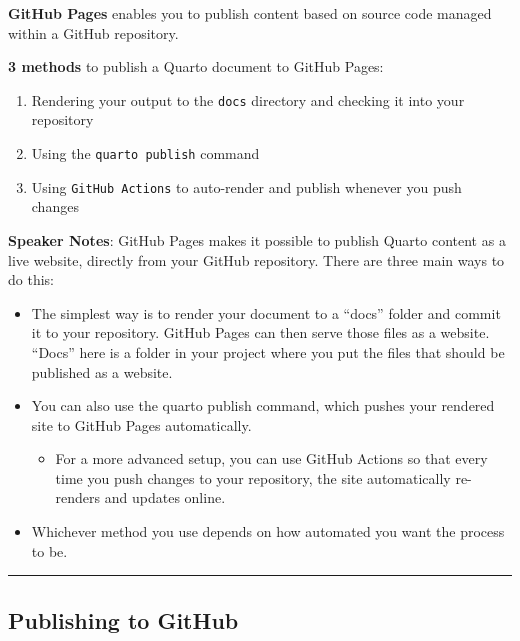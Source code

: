 \documentclass[
  letterpaper,
  DIV=11,
  numbers=noendperiod]{scrartcl}
\providecommand{\tightlist}{%
  \setlength{\itemsep}{0pt}\setlength{\parskip}{0pt}}
\begin{document}
\textbf{GitHub Pages} enables you to publish content based on source
code managed within a GitHub repository.

\textbf{3 methods} to publish a Quarto document to GitHub Pages:

\begin{enumerate}
\def\labelenumi{\arabic{enumi}.}
\tightlist
\item
  Rendering your output to the \texttt{docs} directory and checking it
  into your repository
\item
  Using the \texttt{quarto\ publish} command
\item
  Using \texttt{GitHub\ Actions} to auto-render and publish whenever you
  push changes
\end{enumerate}

\textbf{Speaker Notes}: GitHub Pages makes it possible to publish Quarto
content as a live website, directly from your GitHub repository. There
are three main ways to do this:

\begin{itemize}
\item
  The simplest way is to render your document to a ``docs'' folder and
  commit it to your repository. GitHub Pages can then serve those files
  as a website. ``Docs'' here is a folder in your project where you put
  the files that should be published as a website.
\item
  You can also use the quarto publish command, which pushes your
  rendered site to GitHub Pages automatically.

  \begin{itemize}
  \tightlist
  \item
    For a more advanced setup, you can use GitHub Actions so that every
    time you push changes to your repository, the site automatically
    re-renders and updates online.
  \end{itemize}
\item
  Whichever method you use depends on how automated you want the process
  to be.
\end{itemize}

\begin{center}\rule{0.5\linewidth}{0.5pt}\end{center}

\subsection{Publishing to GitHub}\label{publishing-to-github-2}
\end{document}
